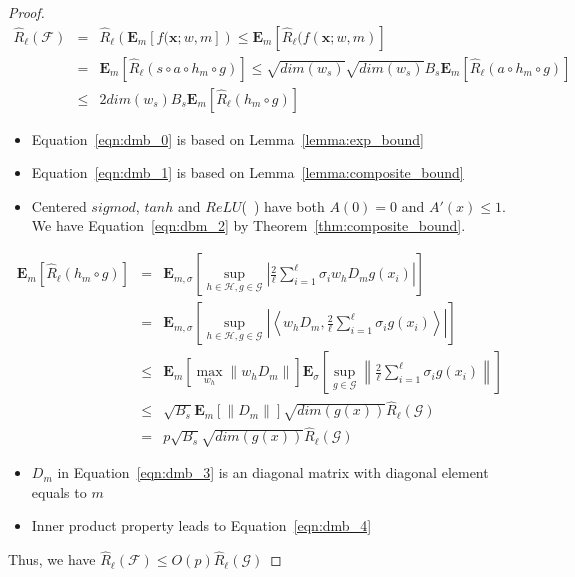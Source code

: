 \documentclass[9pt]{article}
\begin{document}
\begin{proof}
    \begin{eqnarray}
        \hat{R}_{\ell}(\mathcal{F}) &=& 
        \hat{R}_{\ell}( \mathbf{E}_m\left[ f(\mathbf{x};w,m\right] ) \leq 
        \mathbf{E}_m\left[ \hat{R}_{\ell}( f(\mathbf{x};w,m) \right] \label{eqn:dmb_0} \\
        &=& \mathbf{E}_m\left[ \hat{R}_{\ell}( s\circ a\circ h_{m}\circ g)\right] \leq \sqrt{dim(w_s)}\sqrt{dim(w_s)}B_s\mathbf{E}_m\left[ \hat{R}_{\ell}( a\circ h_{m}\circ g)\right] \label{eqn:dmb_1} \\
        &\leq&2dim(w_s)B_s\mathbf{E}_m\left[ \hat{R}_{\ell}( h_{m}\circ g)\right] \label{eqn:dmb_1} \label{eqn:dbm_2}
    \end{eqnarray}
    \begin{itemize}
        \item Equation~\ref{eqn:dmb_0} is based on Lemma~\ref{lemma:exp_bound}
        \item Equation~\ref{eqn:dmb_1} is based on Lemma~\ref{lemma:composite_bound} 
        \item Centered $sigmod$, $tanh$ and $ReLU$(~\cite{Nair2010}) have both $A(0)=0$ and $A'(x)\leq 1$. 
            We have Equation~\ref{eqn:dbm_2} by Theorem~\ref{thm:composite_bound}.
    \end{itemize}

    \begin{eqnarray}
        \mathbf{E}_m\left[ \hat{R}_{\ell}( h_{m}\circ g)\right] &=&
        {\mathbf{E}}_{m,\sigma}\left[ \sup_{h\in\mathcal{H},g\in\mathcal{G}}
        \left|\frac{2}{\ell}\sum_{i=1}^\ell\sigma_i w_hD_m g(x_i) \right|\right] \label{eqn:dmb_3}\\
        &=&
        {\mathbf{E}}_{m,\sigma}\left[ \sup_{h\in\mathcal{H},g\in\mathcal{G}}
        \left|
        \left<
            w_hD_m ,
            \frac{2}{\ell}\sum_{i=1}^\ell\sigma_i g(x_i) 
        \right>
        \right|\right] \nonumber \\
        &\leq& \mathbf{E}_m\left[\max_{w_h}\|w_hD_m\|\right]
        {\mathbf{E}}_{\sigma}\left[ \sup_{g\in\mathcal{G}}
        \left\|
            \frac{2}{\ell}\sum_{i=1}^\ell\sigma_i g(x_i) 
        \right\|\right] \label{eqn:dmb_4}  \\
        &\leq& \sqrt{B_s}\mathbf{E}_m[\|D_m\|]\sqrt{dim(g(x))}\hat{R}_\ell(\mathcal{G}) \nonumber \\%
        &=& p\sqrt{B_s}\sqrt{dim(g(x))}\hat{R}_\ell(\mathcal{G}) \nonumber
    \end{eqnarray}
    
    \begin{itemize}
        \item $D_m$ in Equation~\ref{eqn:dmb_3} is an diagonal matrix with diagonal element equals to $m$
        \item Inner product property leads to Equation~\ref{eqn:dmb_4}
    \end{itemize}
    Thus, we have 
   $ \hat{R}_{\ell}(\mathcal{F}) \leq O(p)\hat{R}_{\ell}(\mathcal{G}) $
\end{proof}
\end{document}
